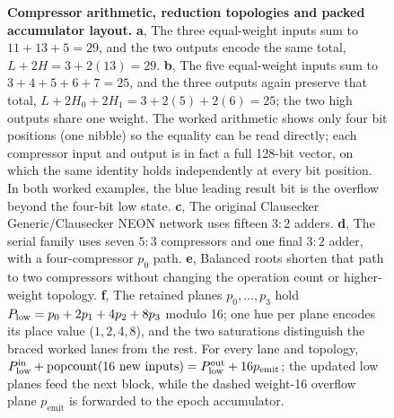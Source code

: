 \documentclass[fleqn,10pt]{wlscirep}
\begin{document}
\begin{figure}[!t]
\caption{\textbf{Compressor arithmetic, reduction topologies and packed accumulator layout.}
\textbf{a}, The three equal-weight inputs sum to $11+13+5=29$, and the two outputs encode the same total, $L+2H=3+2(13)=29$.
\textbf{b}, The five equal-weight inputs sum to $3+4+5+6+7=25$, and the three outputs again preserve that total, $L+2H_0+2H_1=3+2(5)+2(6)=25$; the two high outputs share one weight.
The worked arithmetic shows only four bit positions (one nibble) so the equality can be read directly; each compressor input and output is in fact a full 128-bit vector, on which the same identity holds independently at every bit position. In both worked examples, the blue leading result bit is the overflow beyond the four-bit low state.
\textbf{c}, The original Clausecker Generic/Clausecker NEON network uses fifteen $3{:}2$ adders.
\textbf{d}, The serial family uses seven $5{:}3$ compressors and one final $3{:}2$ adder, with a four-compressor $p_0$ path.
\textbf{e}, Balanced roots shorten that path to two compressors without changing the operation count or higher-weight topology.
\textbf{f}, The retained planes $p_0,\ldots,p_3$ hold $P_{\rm low}=p_0+2p_1+4p_2+8p_3$ modulo 16; one hue per plane encodes its place value ($1,2,4,8$), and the two saturations distinguish the braced worked lanes from the rest. For every lane and topology,
$P_{\rm low}^{\rm in}+\operatorname{popcount}(\text{16 new inputs})
=P_{\rm low}^{\rm out}+16p_{\mathrm{emit}}$; the updated low planes feed the next block, while the dashed weight-16 overflow plane $p_{\mathrm{emit}}$ is forwarded to the epoch accumulator.}
\label{fig:planes}
\end{figure}
\end{document}

